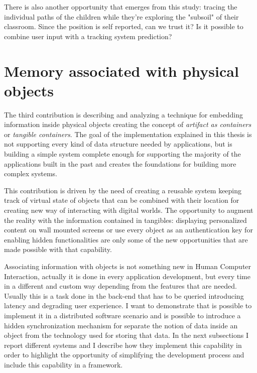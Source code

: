There is also another opportunity that emerges from this study: tracing the individual paths of the children while they're exploring the "subsoil" of their classroom. Since the position is self reported, can we trust it? Is it possible to combine user input with a tracking system prediction?

\section{Memory associated with physical objects}
The third contribution is describing and analyzing a technique for embedding information inside physical objects creating the concept of \textit{artifact as containers} or \textit{tangible containers}. The goal of the implementation explained in this thesis is not supporting every kind of data structure needed by applications, but is building a simple system complete enough for supporting the majority of the applications built in the past and creates the foundations for building more complex systems.

This contribution is driven by the need of creating a reusable system keeping track of virtual state of objects that can be combined with their location for creating new way of interacting with digital worlds. The opportunity to augment the reality with the information contained in tangibles: displaying personalized content on wall mounted screens or use every object as an authentication key for enabling hidden functionalities are only some of the new opportunities that are made possible with that capability.

Associating information with objects is not something new in Human Computer Interaction, actually it is done in every application development, but every time in a different and custom way depending from the features that are needed. Usually this is a task done in the back-end that has to be queried introducing latency and degrading user experience. I want to demonstrate that is possible to implement it in a distributed software scenario and is possible to introduce a hidden synchronization mechanism for separate the notion of data inside an object from the technology used for storing that data. In the next subsections I report different systems and I describe how they implement this capability in order to highlight the opportunity of simplifying the development process and include this capability in a framework.

